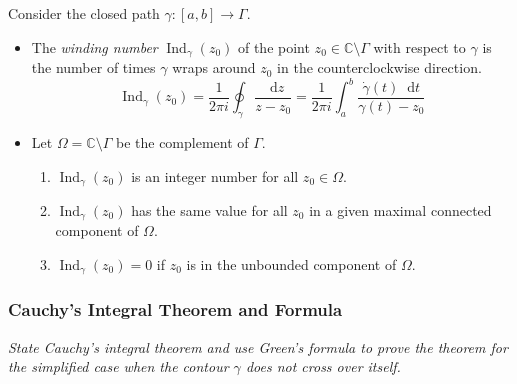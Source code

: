 \documentclass[11pt, a4paper]{article}
\newcommand{\question}[1]{\textit{#1}\vspace{2mm}}
\newcommand{\C}{\mathbb{C}} %
\newcommand{\diff}{\mathop{}\!\mathrm{d}} %
\begin{document}
Consider the closed path $ \gamma : [a, b] \to \Gamma $.
\begin{itemize}
	\item The \textit{winding number} $ \operatorname{Ind}_{\gamma}(z_0) $ of the point $ z_0 \in \C \setminus \Gamma $ with respect to $ \gamma $ is the number of times $ \gamma $ wraps around $ z_0 $ in the counterclockwise direction.
	\begin{equation*}
		\operatorname{Ind}_{\gamma}(z_0) = \frac{1}{2\pi i} \oint_{\gamma} \frac{\diff z}{z - z_0} = \frac{1}{2\pi i} \int_{a}^{b} \frac{\dot{\gamma}(t) \diff t}{\gamma(t) - z_0} 
	\end{equation*}
	
	\item Let $ \Omega = \C \setminus \Gamma $ be the complement of $ \Gamma $.
	\begin{enumerate}
		\item $ \displaystyle{	\operatorname{Ind}_{\gamma}(z_0)} $ is an integer number for all $ z_0 \in \Omega $. 
		
		\item $ \displaystyle{	\operatorname{Ind}_{\gamma}(z_0)} $ has the same value for all $ z_0 $ in a given maximal connected component of $ \Omega $.
		
		\item $ \displaystyle{	\operatorname{Ind}_{\gamma}(z_0)} = 0$ if $ z_0 $ is in the unbounded component of $ \Omega $. 
	\end{enumerate}
	
\end{itemize}


\subsubsection{Cauchy's Integral Theorem and Formula}
\question{State Cauchy's integral theorem and use Green's formula to prove the theorem for the simplified case when the contour $ \gamma $ does not cross over itself.}
\end{document}
